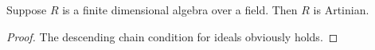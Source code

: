 \begin{lemma}
\label{lemma-finite-dimensional-algebra}
Suppose $R$ is a finite dimensional algebra over a field.
Then $R$ is Artinian.
\end{lemma}

\begin{proof}
The descending chain condition for ideals obviously holds.
\end{proof}